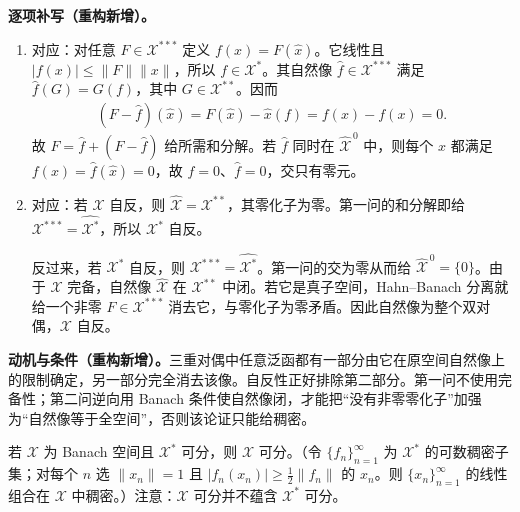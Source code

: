\documentclass[../../main.tex]{subfiles}
\begin{document}
\begin{solution}
\textbf{逐项补写（重构新增）。}
\begin{enumerate}
\item 对应：对任意 $F\in\mathcal X^{***}$ 定义 $f(x)=F(\widehat x)$。它线性且 $|f(x)|\le\|F\|\|x\|$，所以 $f\in\mathcal X^*$。其自然像 $\widehat f\in\mathcal X^{***}$ 满足 $\widehat f(G)=G(f)$，其中 $G\in\mathcal X^{**}$。因而
\begin{align*}
(F-\widehat f)(\widehat x)=F(\widehat x)-\widehat x(f)=f(x)-f(x)=0.
\end{align*}
故 $F=\widehat f+(F-\widehat f)$ 给所需和分解。若 $\widehat f$ 同时在 $\widehat{\mathcal X}^{\,0}$ 中，则每个 $x$ 都满足 $f(x)=\widehat f(\widehat x)=0$，故 $f=0$、$\widehat f=0$，交只有零元。
\item 对应：若 $\mathcal X$ 自反，则 $\widehat{\mathcal X}=\mathcal X^{**}$，其零化子为零。第一问的和分解即给 $\mathcal X^{***}=\widehat{\mathcal X^*}$，所以 $\mathcal X^*$ 自反。

反过来，若 $\mathcal X^*$ 自反，则 $\mathcal X^{***}=\widehat{\mathcal X^*}$。第一问的交为零从而给 $\widehat{\mathcal X}^{\,0}=\{0\}$。由于 $\mathcal X$ 完备，自然像 $\widehat{\mathcal X}$ 在 $\mathcal X^{**}$ 中闭。若它是真子空间，Hahn--Banach 分离就给一个非零 $F\in\mathcal X^{***}$ 消去它，与零化子为零矛盾。因此自然像为整个双对偶，$\mathcal X$ 自反。
\end{enumerate}
\end{solution}
\begin{remark}
\textbf{动机与条件（重构新增）。}三重对偶中任意泛函都有一部分由它在原空间自然像上的限制确定，另一部分完全消去该像。自反性正好排除第二部分。第一问不使用完备性；第二问逆向用 Banach 条件使自然像闭，才能把“没有非零零化子”加强为“自然像等于全空间”，否则该论证只能给稠密。
\end{remark}
\begin{exercise}\label{exercise:ch05-separable-dual}
若 $\mathcal X$ 为 Banach 空间且 $\mathcal X^*$ 可分，则 $\mathcal X$ 可分。（令 $\{f_n\}_{n=1}^\infty$ 为 $\mathcal X^*$ 的可数稠密子集；对每个 $n$ 选 $\|x_n\|=1$ 且 $|f_n(x_n)|\ge\frac12\|f_n\|$ 的 $x_n$。则 $\{x_n\}_{n=1}^\infty$ 的线性组合在 $\mathcal X$ 中稠密。）注意：$\mathcal X$ 可分并不蕴含 $\mathcal X^*$ 可分。
\end{exercise}
\end{document}
